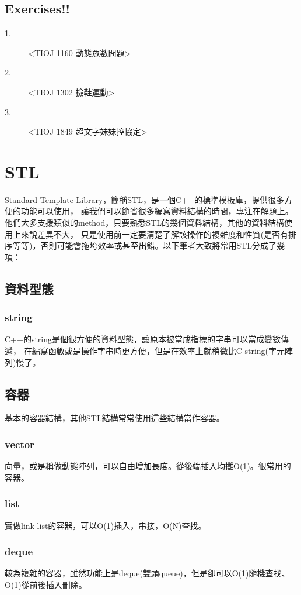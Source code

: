 \documentclass{article}
\begin{document}
\subsection{Exercises!!}
\begin{description}
\item[ 1.]<TIOJ 1160 動態眾數問題>
\item[ 2.]<TIOJ 1302 撿鞋運動>
\item[ 3.]<TIOJ 1849 超文字妹妹控協定>
\end{description}

\section{STL}
Standard Template Library，簡稱STL，是一個C++的標準模板庫，提供很多方便的功能可以使用，
讓我們可以節省很多編寫資料結構的時間，專注在解題上。
他們大多支援類似的method，只要熟悉STL的幾個資料結構，其他的資料結構使用上來說差異不大，
只是使用前一定要清楚了解該操作的複雜度和性質(是否有排序等等)，否則可能會拖垮效率或甚至出錯。以下筆者大致將常用STL分成了幾項：

\subsection{資料型態}
\subsubsection{string}
C++的string是個很方便的資料型態，讓原本被當成指標的字串可以當成變數傳遞，
在編寫函數或是操作字串時更方便，但是在效率上就稍微比C string(字元陣列)慢了。

\subsection{容器}
基本的容器結構，其他STL結構常常使用這些結構當作容器。
\subsubsection{vector}
向量，或是稱做動態陣列，可以自由增加長度。從後端插入均攤O(1)。很常用的容器。
\subsubsection{list}
實做link-list的容器，可以O(1)插入，串接，O(N)查找。
\subsubsection{deque}
較為複雜的容器，雖然功能上是deque(雙頭queue)，但是卻可以O(1)隨機查找、O(1)從前後插入刪除。
\end{document}
